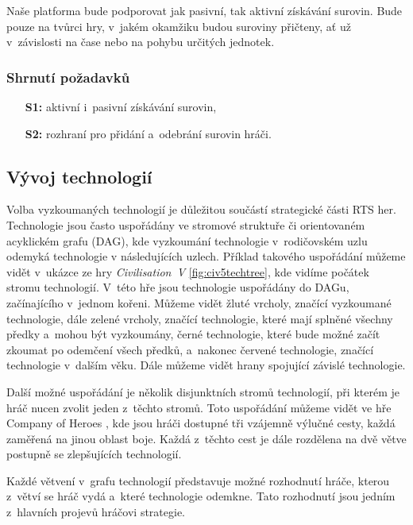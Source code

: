 Naše platforma bude podporovat jak pasivní, tak aktivní získávání surovin. Bude pouze na tvůrci hry, v~jakém okamžiku budou suroviny přičteny, ať už v~závislosti na čase nebo na pohybu určitých jednotek. 

\subsubsection{Shrnutí požadavků}

\begin{itemize}
	\item[\textbf{S1:}] aktivní i~pasivní získávání surovin,
	\item[\textbf{S2:}] rozhraní pro přidání a~odebrání surovin hráči.
\end{itemize}

\subsection{Vývoj technologií}
\label{sec:vyzkum}
Volba vyzkoumaných technologií je důležitou součástí strategické části RTS her. Technologie jsou často uspořádány ve stromové struktuře či orientovaném acyklickém grafu (DAG), kde vyzkoumání technologie v~rodičovském uzlu odemyká technologie v následujících uzlech. Příklad takového uspořádání můžeme vidět v~ukázce ze hry \emph{Civilisation~V} \citep{site:civ5} \ref{fig:civ5techtree}, kde vidíme počátek stromu technologií. V~této hře jsou technologie uspořádány do DAGu, začínajícího v~jednom kořeni. Můžeme vidět žluté vrcholy, značící vyzkoumané technologie, dále zelené vrcholy, značící technologie, které mají splněné všechny předky a~mohou být vyzkoumány, černé technologie, které bude možné začít zkoumat po odemčení všech předků, a~nakonec červené technologie, značící technologie v~dalším věku. Dále můžeme vidět hrany spojující závislé technologie. 

Další možné uspořádání je několik disjunktních stromů technologií, při kterém je hráč nucen zvolit jeden z~těchto stromů. 
Toto uspořádání můžeme vidět ve hře Company of Heroes \citep{site:COH}, kde jsou hráči dostupné tři vzájemně výlučné cesty, každá zaměřená na jinou oblast boje. Každá z~těchto cest je dále rozdělena na dvě větve postupně se zlepšujících technologií.

Každé větvení v~grafu technologií představuje možné rozhodnutí hráče, kterou z~větví se hráč vydá a~které technologie odemkne. Tato rozhodnutí jsou jedním z~hlavních projevů hráčovi strategie.

